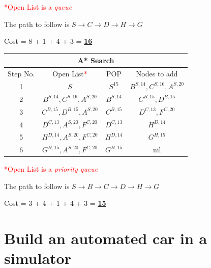 \documentclass[12pt, letterpaper]{article}
\begin{document}
\textcolor{red}{*Open List is a \textit{queue}}

The path to follow is $S\rightarrow C\rightarrow D\rightarrow H\rightarrow G$

Cost = 8 + 1 + 4 + 3 = \underline{\textbf{16}}

\begin{center}
    \begin{tabular}{|c|c|c|c|}
    \hline
    \multicolumn{4}{|c|}{A* Search}\\
    \hline
    Step No. & Open List\textcolor{red}{*} & POP & Nodes to add \\ 
    \hline
    1 & $S$ & $S^{15}$ & $B^{S,14}, C^{S,16}, A^{S,20}$ \\
    \hline
    2 & $B^{S,14}, C^{S,16}, A^{S,20}$ & $B^{S,14}$ & $C^{B,15}, D^{B,15}$ \\
    \hline
    3 & $C^{B,15}, D^{B,15}, A^{S,20}$ & $C^{B,15}$ & $D^{C,13},F^{C,20}$ \\
    \hline
    4 & $D^{C,13}, A^{S,20}, F^{C,20}$ & $D^{C,13}$ & $H^{D,14}$\\
    \hline
    5 & $H^{D,14}, A^{S,20}, F^{C,20}$ & $H^{D,14}$ & $G^{H,15}$\\
    \hline
    6 & $G^{H,15}, A^{S,20}, F^{C,20}$ & $G^{H,15}$ & nil\\
    \hline
    \end{tabular}
\end{center}

\textcolor{red}{*Open List is a \textit{priority queue}}

The path to follow is $S\rightarrow B\rightarrow C\rightarrow D\rightarrow H\rightarrow G$

Cost = 3 + 4 + 1 + 4 + 3 = \underline{\textbf{15}}

\section{Build an automated car in a simulator}
\end{document}

